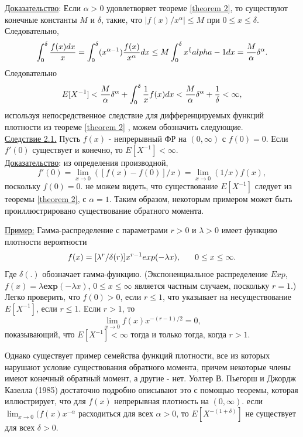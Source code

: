 \documentclass[13pt]{article}
\begin{document}
\underline{Доказательство}:
Если $\alpha > 0$ удовлетворяет теореме \ref{theorem 2}, то существуют конечные константы $M$ и $\delta$, такие, что $|f(x)/x^{\alpha}|\le M$ при $0\le x \le \delta$. Следовательно, 
\[
\int_{0}^{\delta}\frac{f(x)dx}{x} = \int_{0}^{\delta}(x^{\alpha - 1})\frac{f(x)}{x^{\alpha}}dx \\
\le M\int_{0}^{\delta}{x^\{alpha - 1}dx =\frac{M}{\alpha}\delta^{\alpha}.
\]
Следовательно 
\[
E[X^{-1}]<\frac{M}{\alpha}\delta^{\alpha} + \int_{0}^{\delta}\frac{1}{x}{f(x)dx}\\
<\frac{M}{\alpha}\delta^{\alpha} + \frac{1}{\delta}< \infty,
\]
используя непосредственное следствие для дифференцируемых функций плотности из теореме \ref{theorem 2} , можем обозначить следующие.\\ 
\underline{Следствие 2.1.} Пусть $f (x)$ - непрерывный ФР на $(0,\infty)$ с $f(0) =0$. Если $f'(0)$ существует и конечно, то $E[X^{-1}]<\infty.$\\
\underline{Доказательство}: из определения производной,
\begin{equation}
    f'(0) = \lim_{x \to 0}{([f(x) - f(0)]/x)}
    = \lim_{x \to 0}(1/x)f(x),
\end{equation}
поскольку $f(0)= 0$. не можем видеть, что существование $E[X^ {-1}]$ следует из теоремы \ref{theorem 2}, с $\alpha = 1$. Таким образом, некоторым примером может быть проиллюстрировано существование обратного момента.\par
\underline{Пример:}
Гамма-распределение с параметрами $r>0$ и $\lambda>0$ имеет функцию плотности вероятности
\begin{equation}
    f(x) = [\lambda^{r}/\delta(r)]x^{r-1}exp(-\lambda x), \hspace{6 mm} 0\le x\le \infty.
\end{equation}
Где $\delta(.)$ обозначает гамма-функцию. (Экспоненциальное распределение $Exp$, $f(x)=\lambda \textbf{exp}(-\lambda x)$, $0\le x \le \infty$ является частным случаем, поскольку $r=1$.) Легко проверить, что $f(0) > 0 $, если $r\le 1$, что указывает на несуществование $E[X^{-1}]$, если $r \le 1$. Если $r > 1$, то
\[
\lim_{x \to 0}f(x)x^{-(r-1)/2} = 0,
\]
показывающий, что $E[X^{-1}] < \infty$ тогда и только тогда, когда $r>1$.\par
Однако существует пример семейства функций плотности, все из которых нарушают условие существования обратного момента, причем некоторые члены имеют конечный обратный момент, а другие - нет. Уолтер В. Пьегорш и Джордж Казелла (1985) достаточно подробно описывают это с помощью теоремы, которая иллюстрирует, что для $f(x)$ непрерывная плотность на $(0, \infty)$. если $\lim_{x \to 0}(f(x)x^{-\alpha}$ расходиться для всех $\alpha > 0$, то $E[X^{-(1+\delta)}]$ не существует для всех $\delta > 0$.\par
\end{document}
